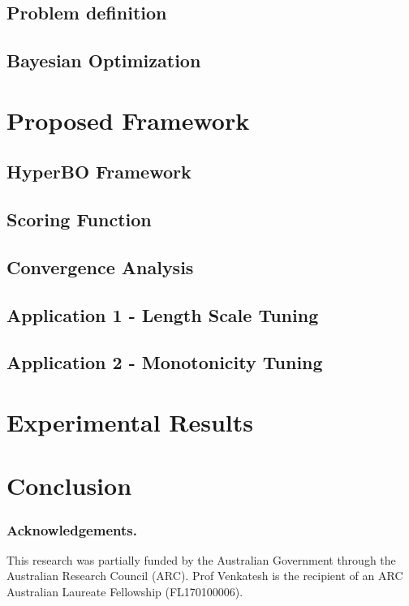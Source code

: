 \documentclass[review]{elsarticle}
\begin{document}
\subsection{Problem definition}


\subsection{Bayesian Optimization}


\section{Proposed Framework}
\subsection{HyperBO Framework}


\subsection{Scoring Function}


\subsection{Convergence Analysis}


\subsection{Application 1 - Length Scale Tuning}


\subsection{Application 2 - Monotonicity Tuning}


\section{Experimental Results}


\section{Conclusion}


\subsubsection*{Acknowledgements.}
This research was partially funded by the Australian Government through the Australian Research Council (ARC). Prof Venkatesh is the recipient of an ARC Australian Laureate Fellowship (FL170100006).


\end{document}
